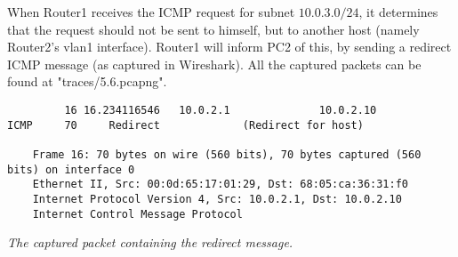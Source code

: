 When Router1 receives the ICMP request for subnet $10.0.3.0/24$, it determines that the request should not be sent to himself, but to another host (namely Router2's vlan1 interface). Router1 will inform PC2 of this, by sending a redirect ICMP message (as captured in Wireshark). All the captured packets can be found at "traces/5.6.pcapng".


\begin{verbatim}
	     16 16.234116546   10.0.2.1              10.0.2.10             ICMP     70     Redirect             (Redirect for host)

	Frame 16: 70 bytes on wire (560 bits), 70 bytes captured (560 bits) on interface 0
	Ethernet II, Src: 00:0d:65:17:01:29, Dst: 68:05:ca:36:31:f0
	Internet Protocol Version 4, Src: 10.0.2.1, Dst: 10.0.2.10
	Internet Control Message Protocol
\end{verbatim}

\textit{The captured packet containing the redirect message.}